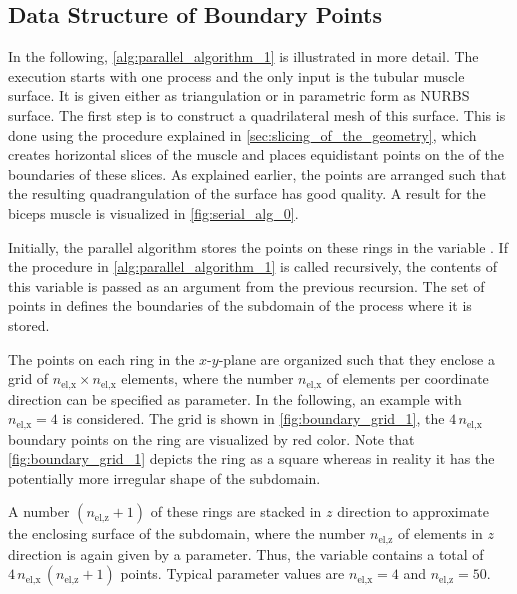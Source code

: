 \subsection{Data Structure of Boundary Points}\label{sec:data_structure_of_boundary_points}

In the following, \cref{alg:parallel_algorithm_1} is illustrated in more detail.
The execution starts with one process and the only input is the tubular muscle surface. It is given either as triangulation or in parametric form as NURBS surface.
The first step is to construct a quadrilateral mesh of this surface. This is done using the procedure explained in \cref{sec:slicing_of_the_geometry}, which creates horizontal slices of the muscle and places equidistant points on the  of the boundaries of these slices. As explained earlier, the points are arranged such that the resulting quadrangulation of the surface has good quality. A result for the biceps muscle is visualized in \cref{fig:serial_alg_0}.

Initially, the parallel algorithm stores the points on these rings in the variable . If the procedure in \cref{alg:parallel_algorithm_1} is called recursively, the contents of this variable is passed as an argument from the previous recursion.
The set of points in  defines the boundaries of the subdomain of the process where it is stored.

The points on each ring in the $x$-$y$-plane are organized such that they enclose a grid of $n_\text{el,x} \times n_\text{el,x}$ elements, where the number $n_\text{el,x}$ of elements per coordinate direction can be specified as parameter. In the following, an example with $n_\text{el,x}=4$ is considered. The grid is shown in \cref{fig:boundary_grid_1}, the $4\,n_\text{el,x}$ boundary points on the ring are visualized by red color. Note that \cref{fig:boundary_grid_1} depicts the ring as a square whereas in reality it has the potentially more irregular shape of the subdomain.

A number $(n_\text{el,z}+1)$ of these rings are stacked in $z$ direction to approximate the enclosing surface of the subdomain, where the number $n_\text{el,z}$ of elements in $z$ direction is again given by a parameter. Thus, the variable  contains a total of $4\,n_\text{el,x}\,(n_\text{el,z}+1)$ points. Typical parameter values are $n_\text{el,x}=4$ and $n_\text{el,z}=50$. 

